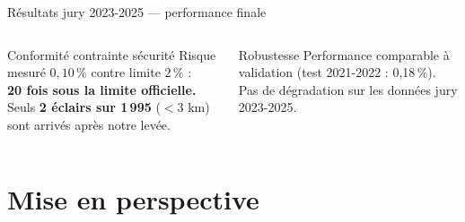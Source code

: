 \documentclass[aspectratio=169,t,11pt]{beamer}
\begin{document}
\begin{frame}{Résultats jury 2023-2025 — performance finale}
\begin{columns}[T]
\begin{exampleblock}{Conformité contrainte sécurité}
\small
Risque mesuré $0{,}10\,\%$ contre limite $2\,\%$ :\\
\textbf{20 fois sous la limite officielle.}\\[3pt]
Seuls \textbf{2 éclairs sur 1\,995} ($<3$ km) sont arrivés après notre levée.
\end{exampleblock}
\vspace{4pt}
\begin{alertblock}{Robustesse}
\footnotesize
Performance comparable à validation (test 2021-2022 : 0,18\,\%).\\
Pas de dégradation sur les données jury 2023-2025.
\end{alertblock}
\end{columns}
\end{frame}

\section{Mise en perspective}
\end{document}
